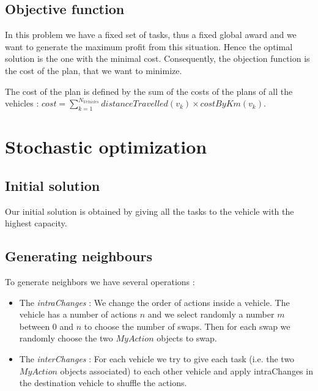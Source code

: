 \documentclass[11pt]{article}
\begin{document}
\subsection{Objective function}

In this problem we have a fixed set of tasks, thus a fixed global award and we want to generate the maximum profit from this situation. Hence the optimal solution is the one with the minimal cost. Consequently, the objection function is the cost of the plan, that we want to minimize.

The cost of the plan is defined by the sum of the costs of the plans of all the vehicles : $cost = \sum\limits_{k=1}^{N_{Vehicles}}{distanceTravelled(v_k) \times costByKm(v_k)}$.


\section{Stochastic optimization}

\subsection{Initial solution}

Our initial solution is obtained by giving all the tasks to the vehicle with the highest capacity.

\subsection{Generating neighbours}
To generate neighbors we have several operations :
\begin{itemize}
    \item The \textit{intraChanges} : We change the order of actions inside a vehicle. The vehicle has a number of actions $n$ and we select randomly a number $m$ between $0$ and $n$ to choose the number of swaps. Then for each swap we randomly choose the two $MyAction$ objects to swap.
    \item The \textit{interChanges} : For each vehicle we try to give each task (i.e. the two $MyAction$ objects associated) to each other vehicle and apply intraChanges in the destination vehicle to shuffle the actions.
\end{itemize}
\end{document}
